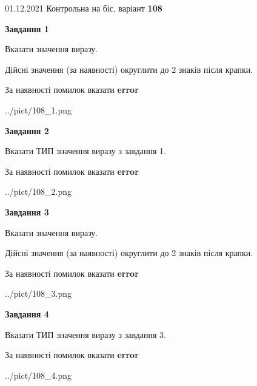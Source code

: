 \documentclass[11pt, ukrainian]{article}
\begin{document}
{01.12.2021 Контрольна на біс, варіант  \No \textbf { 108 }\par}
{
\begin {large}
{\begin {center}\textbf{Завдання 1}\end {center}}\par
Вказати значення виразу. \par
Дійсні значення (за наявності) округлити до 2 знаків після крапки. \par
За наявності помилок вказати \textbf{error}

\begin{center}
	{../pict/108_1.png}
\end{center}
\newpage

{\begin {center}\textbf{Завдання 2}\end {center}}\par
Вказати ТИП значення виразу з завдання 1. \par
За наявності помилок вказати \textbf{error}

\begin{center}
	{../pict/108_2.png}
\end{center}
\newpage

{\begin {center}\textbf{Завдання 3}\end {center}}\par
Вказати значення виразу. \par
Дійсні значення (за наявності) округлити до 2 знаків після крапки. \par
За наявності помилок вказати \textbf{error}

\begin{center}
	{../pict/108_3.png}
\end{center}
\newpage

{\begin {center}\textbf{Завдання 4}\end {center}}\par
Вказати ТИП значення виразу з завдання 3. \par
За наявності помилок вказати \textbf{error}

\begin{center}
	{../pict/108_4.png}
\end{center}
\newpage


\end{large}}
\end{document}
